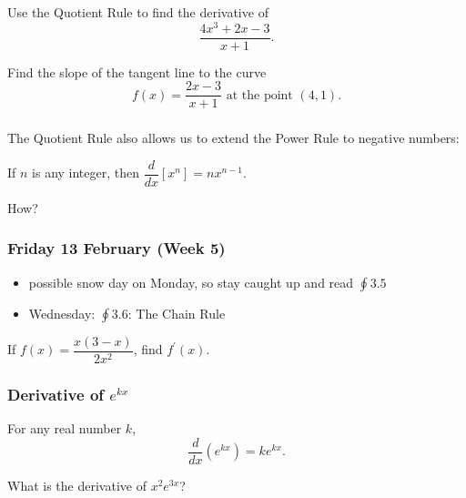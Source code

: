 \documentclass[14pt]{beamer}
\begin{document}
%
%

\begin{frame}
\frametitle{}
\begin{exe} Use the Quotient Rule to find the derivative of 
\[\frac{4x^3+2x-3}{x+1}.\]
\end{exe}
\begin{exe} Find the slope of the tangent line to the curve 
\[f(x)=\dfrac{2x-3}{x+1}\text{ at the point }(4,1).\] 
\end{exe}
\end{frame}

\begin{frame}
\frametitle{}
The Quotient Rule also allows us to extend the Power Rule to negative numbers:  

If $n$ is any integer, then $\dfrac{d}{dx}\left[ x^n \right] = nx^{n-1}.$

\begin{que} How? \end{que}
\end{frame}


\begin{frame}
\frametitle{Friday 13 February (Week 5)}
\begin{itemize}
\item possible snow day on Monday, so stay caught up and read $\oint 3.5$
\item Wednesday: $\oint 3.6$: The Chain Rule
\end{itemize}
\end{frame}

\begin{frame}%
\begin{exe} If $f(x)=\dfrac{x(3-x)}{2x^2}$, find $f^{\prime}(x).$ \end{exe}
\end{frame}

\begin{frame}%
\frametitle{Derivative of $e^{kx}$}
For any real number $k$,
\[\frac{d}{dx} \left( e^{kx} \right) = ke^{kx}.\]
\begin{exe}What is the derivative of $x^2 e^{3x}$? \end{exe}
\end{frame}
\end{document}
